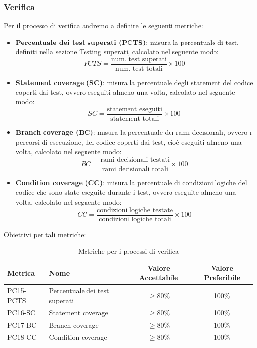 \documentclass[a4paper,10pt]{article}
\begin{document}
\subsubsection{Verifica}
Per il processo di verifica andremo a definire le seguenti metriche:
\begin{itemize}
    \item \textbf{Percentuale dei test superati (PCTS)}: misura la percentuale di test, definiti nella sezione Testing superati, calcolato nel seguente modo: 
    \[
        PCTS = \frac{\text{num. test superati}}{\text{num. test totali}} \times 100
    \]
    \item \textbf{Statement coverage (SC)}: misura la percentuale degli statement del codice coperti dai test, ovvero eseguiti almeno una volta, calcolato nel seguente modo:
    \[
        SC = \frac{\text{statement eseguiti}}{\text{statement totali}} \times 100
    \]
    \item \textbf{Branch coverage (BC)}: misura la percentuale dei rami decisionali, ovvero i percorsi di esecuzione, del codice coperti dai test, cioè eseguiti almeno una volta, calcolato nel seguente modo:
    \[
        BC = \frac{\text{rami decisionali testati}}{\text{rami decisionali totali}} \times 100
    \]
    \item \textbf{Condition coverage (CC)}: misura la percentuale di condizioni logiche del codice che sono state eseguite durante i test, ovvero eseguite almeno una volta, calcolato nel seguente modo:
    \[
        CC = \frac{\text{condizioni logiche testate}}{\text{condizioni logiche totali}} \times 100
    \]
\end{itemize}
Obiettivi per tali metriche:
\begin{table}[H]
\centering
\renewcommand{\arraystretch}{1.2}
\begin{tabular}{|l|l|c|c|}
\hline
\textbf{Metrica} & \textbf{Nome} & \textbf{Valore Accettabile} & \textbf{Valore Preferibile} \\
\hline
PC15-PCTS & Percentuale dei test superati & $\geq 80\%$ & 100\% \\
PC16-SC  & Statement coverage  & $\geq 80\%$ & 100\% \\
PC17-BC  & Branch coverage  & $\geq 80\%$ & 100\% \\
PC18-CC  & Condition coverage  & $\geq 80\%$ & 100\% \\
\hline
\end{tabular}
\caption{Metriche per i processi di verifica}
\label{tab:metriche-verifica}
\end{table}
\end{document}
